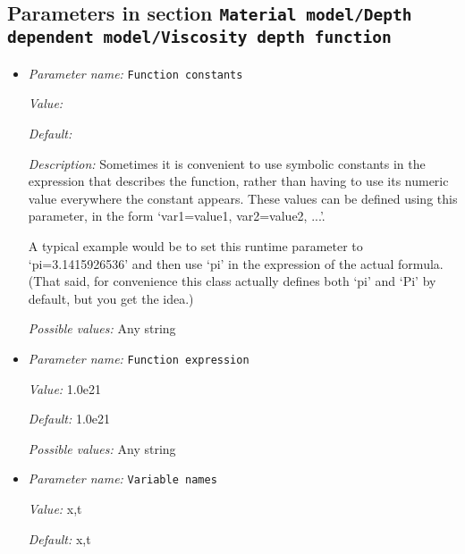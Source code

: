 \subsection{Parameters in section \tt Material model/Depth dependent model/Viscosity depth function}
\label{parameters:Material_20model/Depth_20dependent_20model/Viscosity_20depth_20function}

\begin{itemize}
\item {\it Parameter name:} {\tt Function constants}
\label{parameters:Material model/Depth dependent model/Viscosity depth function/Function constants}


{\it Value:} 


{\it Default:} 


{\it Description:} Sometimes it is convenient to use symbolic constants in the expression that describes the function, rather than having to use its numeric value everywhere the constant appears. These values can be defined using this parameter, in the form `var1=value1, var2=value2, ...'.

A typical example would be to set this runtime parameter to `pi=3.1415926536' and then use `pi' in the expression of the actual formula. (That said, for convenience this class actually defines both `pi' and `Pi' by default, but you get the idea.)


{\it Possible values:} Any string
\item {\it Parameter name:} {\tt Function expression}
\label{parameters:Material model/Depth dependent model/Viscosity depth function/Function expression}


{\it Value:} 1.0e21


{\it Default:} 1.0e21


{\it Possible values:} Any string
\item {\it Parameter name:} {\tt Variable names}
\label{parameters:Material model/Depth dependent model/Viscosity depth function/Variable names}


{\it Value:} x,t


{\it Default:} x,t



\end{itemize}
